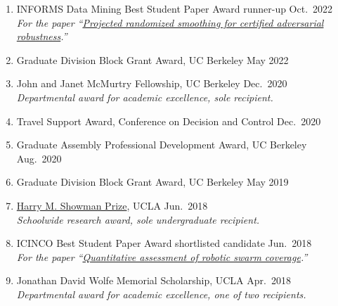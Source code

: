 \documentclass[11pt]{article}
\newcommand{\cvdate}[1]{\hfill#1}			%
\begin{document}
\begin{enumerate}[label={\arabic*.}]
		\item INFORMS Data Mining Best Student Paper Award runner-up
		\cvdate{Oct.\ 2022} \\
		\textit{For the paper ``\href{https://brendon-anderson.github.io/files/publications/pfrommer2023projected.pdf}{Projected randomized smoothing for certified adversarial robustness}.''}
		\item Graduate Division Block Grant Award, UC Berkeley
		\cvdate{May 2022}
		\item John and Janet McMurtry Fellowship, UC Berkeley
		\cvdate{Dec.\ 2020} \\
		\textit{Departmental award for academic excellence, sole recipient.}
		\item Travel Support Award, Conference on Decision and Control
		\cvdate{Dec.\ 2020}
		\item Graduate Assembly Professional Development Award, UC Berkeley
		\cvdate{Aug.\ 2020}
		\item Graduate Division Block Grant Award, UC Berkeley
		\cvdate{May 2019}
		\item \href{https://samueli.ucla.edu/2018-ucla-samueli-commencement-awards/}{Harry M. Showman Prize}, UCLA
		\cvdate{Jun.\ 2018} \\
		\textit{Schoolwide research award, sole undergraduate recipient.}
		\item ICINCO Best Student Paper Award shortlisted candidate
		\cvdate{Jun.\ 2018} \\
		\textit{For the paper ``\href{https://arxiv.org/pdf/1806.02488.pdf}{Quantitative assessment of robotic swarm coverage}.''}
		\item Jonathan David Wolfe Memorial Scholarship, UCLA
		\cvdate{Apr.\ 2018} \\
		\textit{Departmental award for academic excellence, one of two recipients.}
	\end{enumerate}
	
	\nocite{*}
	
	
\end{document}
